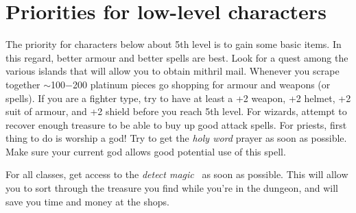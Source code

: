 \section{Priorities for low-level characters}\label{sec:low}

The priority for characters below about 5th level is to gain some
basic items. In this regard, better armour and better spells are best.
Look for a
quest among the various islands that will allow you to obtain
mithril mail. Whenever you scrape together $\sim$100$-$200 platinum
pieces go shopping for armour and weapons (or spells). If you are a
fighter type, try to have at least a +2
weapon, +2 helmet, +2 suit of armour, and +2 shield before you reach 5th level.
For wizards, attempt to recover enough treasure to be able to buy
up good attack spells. For priests, first thing to do is worship a god!
Try to get the {\em holy word} prayer as soon as possible. Make sure
your current god allows good potential use of this spell.

For all classes, get access to the {\em detect magic} \incantation\
as soon as possible.
This will allow you to sort through the treasure you find while you're in
the dungeon, and will save you time and money at the shops.
